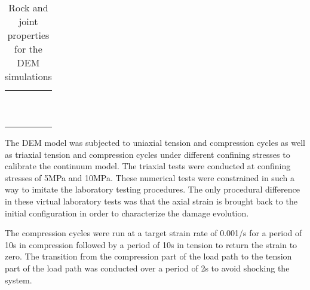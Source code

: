 \begin{table} 
    \centering 
    \caption{Rock and joint properties for the DEM simulations}
    \label{tab:demProp}
    \begin{tabular}{ c c }
         &  \\ 
         &  \\ 
         &  \\ 
         &  \\ 
         &  \\ 
         &  \\ 
         &  \\ 
         &  \\ 
         &  \\ 
         &  \\ 
    \end{tabular} 
\end{table}
The DEM model was subjected to uniaxial tension and compression cycles
as well as triaxial tension and compression cycles under different
confining stresses to calibrate the continuum model. The triaxial
tests were conducted at confining stresses of 5MPa and 10MPa. These
numerical tests were constrained in such a way to imitate the laboratory
testing procedures. The only procedural difference in these virtual
laboratory tests was that the axial strain is brought back to the
initial configuration in order to characterize the damage evolution.

The compression cycles were run at a target strain rate of 0.001/s
for a period of 10s in compression followed by a period of 10s in
tension to return the strain to zero. The transition from the compression
part of the load path to the tension part of the load path was conducted
over a period of 2s to avoid shocking the system.

